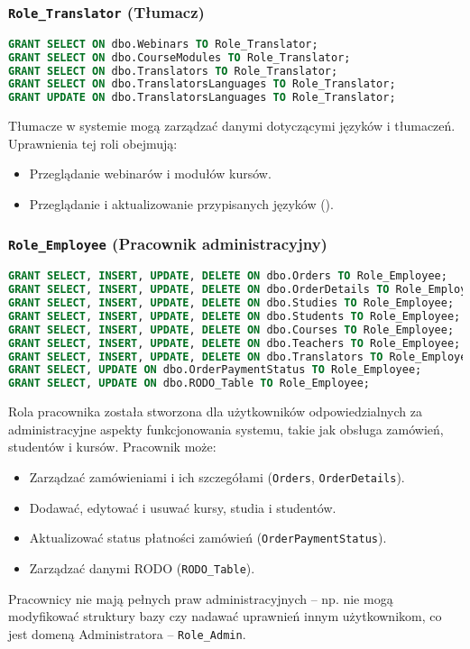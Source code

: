 \documentclass[12pt]{article}
\begin{document}
\subsubsection{\texttt{Role\_Translator} (Tłumacz)}


\begin{lstlisting}[language=SQL]
GRANT SELECT ON dbo.Webinars TO Role_Translator;
GRANT SELECT ON dbo.CourseModules TO Role_Translator;
GRANT SELECT ON dbo.Translators TO Role_Translator;
GRANT SELECT ON dbo.TranslatorsLanguages TO Role_Translator;
GRANT UPDATE ON dbo.TranslatorsLanguages TO Role_Translator;
\end{lstlisting}



\noindent Tłumacze w systemie mogą zarządzać danymi dotyczącymi języków i tłumaczeń. Uprawnienia tej roli obejmują:
\begin{itemize}
    \item Przeglądanie webinarów i modułów kursów.
        \item Przeglądanie i aktualizowanie przypisanych języków ().
\end{itemize}


\subsubsection{\texttt{Role\_Employee} (Pracownik administracyjny)}


\begin{lstlisting}[language=SQL]
GRANT SELECT, INSERT, UPDATE, DELETE ON dbo.Orders TO Role_Employee;
GRANT SELECT, INSERT, UPDATE, DELETE ON dbo.OrderDetails TO Role_Employee;
GRANT SELECT, INSERT, UPDATE, DELETE ON dbo.Studies TO Role_Employee;
GRANT SELECT, INSERT, UPDATE, DELETE ON dbo.Students TO Role_Employee;
GRANT SELECT, INSERT, UPDATE, DELETE ON dbo.Courses TO Role_Employee;
GRANT SELECT, INSERT, UPDATE, DELETE ON dbo.Teachers TO Role_Employee;
GRANT SELECT, INSERT, UPDATE, DELETE ON dbo.Translators TO Role_Employee;
GRANT SELECT, UPDATE ON dbo.OrderPaymentStatus TO Role_Employee;
GRANT SELECT, UPDATE ON dbo.RODO_Table TO Role_Employee;
\end{lstlisting}



\noindent Rola pracownika została stworzona dla użytkowników odpowiedzialnych za administracyjne aspekty funkcjonowania systemu, takie jak obsługa zamówień, studentów i kursów. Pracownik może:
\begin{itemize}
    \item Zarządzać zamówieniami i ich szczegółami (\texttt{Orders}, \texttt{OrderDetails}).
    \item Dodawać, edytować i usuwać kursy, studia i studentów.
    \item Aktualizować status płatności zamówień (\texttt{OrderPaymentStatus}).
    \item Zarządzać danymi RODO (\texttt{RODO\_Table}).
    
\end{itemize}
Pracownicy nie mają pełnych praw administracyjnych – np. nie mogą modyfikować struktury bazy czy nadawać uprawnień innym użytkownikom, co jest domeną Administratora -- \texttt{Role\_Admin}.
\end{document}
